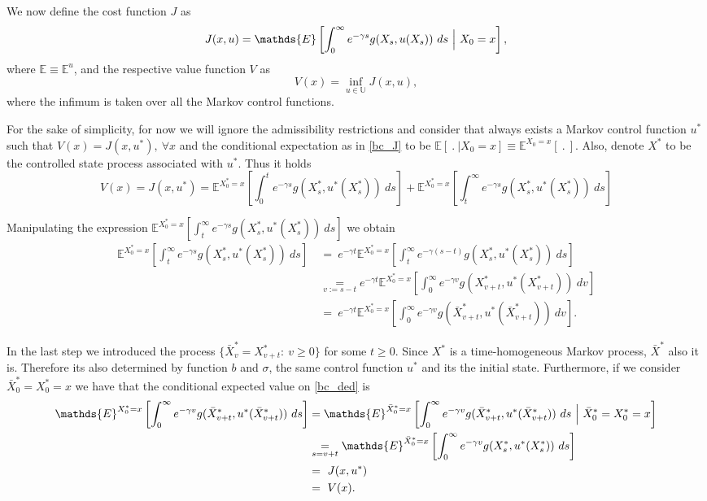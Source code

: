 We now define the cost function $J$ as
\begin{equation}
	 J(x,u)=\mathds{E}\left[ \int^\infty_0 e^{-\gamma s} g(X_s,u(X_s)) \ ds \ \Big{|} \ X_0=x \right],
	 \label{bc_J}
\end{equation}
where $\mathds{E} \equiv \mathds{E}^u$, and the respective value function $V$ as
\begin{equation}
	V(x)=\inf_{u \in \mathds{U}} J(x,u),
	\label{bc_V}
\end{equation}
where the infimum is taken over all the Markov control functions.

For the sake of simplicity, for now we will ignore the admissibility restrictions and consider that always exists a Markov control function $u^*$ such that $V(x)=J(x,u^*), \ \forall x$ and the conditional expectation as in \eqref{bc_J} to be $\mathds{E}\left[\ . \ | X_0=x \right] \equiv \mathds{E}^{X_0=x}\left[\ . \ \right]$. Also, denote $X^*$ to be the controlled state process associated with $u^*$. Thus it holds
\begin{equation}
V(x)=J(x,u^*)=\mathds{E}^{X^*_0=x}\left[ \int^t_0 e^{-\gamma s} g(X^*_s,u^*(X^*_s)) \ ds\right] + \mathds{E}^{X^*_0=x}\left[ \int^\infty_t e^{-\gamma s} g(X^*_s,u^*(X^*_s)) \ ds\right]
	\label{bc_V2}
\end{equation}

Manipulating the expression $\mathds{E}^{X^*_0=x}\left[ \int^\infty_t e^{-\gamma s} g(X^*_s,u^*(X^*_s)) \ ds\right]$ we obtain
\begin{align}
\mathds{E}^{X^*_0=x}\left[ \int^\infty_t e^{-\gamma s} g(X^*_s,u^*(X^*_s)) \ ds\right]
  \ &=  \ e^{-\gamma t}\mathds{E}^{X^*_0=x}\left[ \int^\infty_t e^{-\gamma (s-t)}g(X^*_s,u^*(X^*_s)) \ ds\right] \nonumber \\
&\underset{v:=s-t}{=}  e^{-\gamma t} \mathds{E}^{X^*_0=x}\left[ \int^\infty_0 e^{-\gamma v}g(X^*_{v+t},u^*(X^*_{v+t})) \ dv\right] \nonumber \\
&= \ e^{-\gamma t}\mathds{E}^{X^*_0=x}\left[ \int^\infty_0 e^{-\gamma v}g(\bar{X}^*_{v+t},u^*(\bar{X}^*_{v+t})) \ dv \right]. \label{bc_ded}
\end{align}

In the last step we introduced the process $\{\bar{X}^*_v=X^*_{v+t}: \ v \geq 0\}$ for some $t\geq 0$. Since $X^*$ is a time-homogeneous Markov process, $\bar{X}^*$ also it is. Therefore its also determined by function $b$ and $\sigma$, the same control function $u^*$ and its the initial state. Furthermore, if we consider $ \bar{X}^*_0=X^*_0=x$ we have that the conditional expected value on \eqref{bc_ded} is
\begin{align}
	\mathds{E}^{X^*_0=x}\left[ \int^\infty_0 e^{-\gamma v}g(\bar{X}^*_{v+t},u^*(\bar{X}^*_{v+t})) \ ds\right]
	&= \mathds{E}^{\bar{X}^*_0=x}\left[ \int^\infty_0 e^{-\gamma v}g(\bar{X}^*_{v+t},u^*(\bar{X}^*_{v+t})) \ ds \ \Big{|} \ \bar{X}^*_0=X^*_0=x \right] \nonumber \\
	&\underset{s=v+t}{=}\mathds{E}^{\bar{X}^*_0=x}\left[ \int^\infty_0 e^{-\gamma v}g(X^*_s,u^*(X^*_s)) \ ds  \right] \nonumber \\
	&= \ J(x,u^*) \nonumber \\
	&= \ V(x). \label{bc_ded2}
\end{align}

